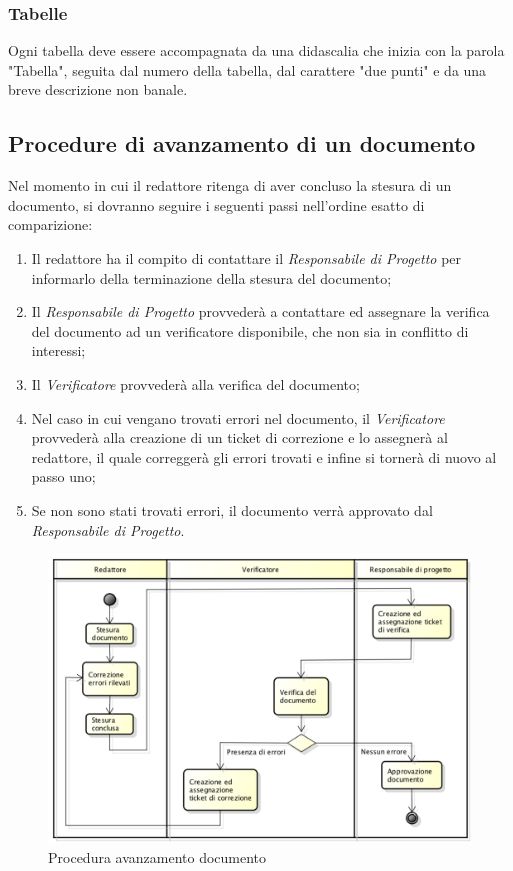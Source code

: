 \subsubsection{Tabelle}
Ogni tabella deve essere accompagnata da una didascalia che inizia con la parola "Tabella", seguita dal numero della tabella, dal carattere "due punti" e da una breve descrizione non banale.

\subsection{Procedure di avanzamento di un documento}
Nel momento in cui il redattore ritenga di aver concluso la stesura di un documento, si dovranno seguire i seguenti passi nell'ordine esatto di comparizione:
\begin{enumerate}
	\item Il redattore ha il compito di contattare il \textit{Responsabile di Progetto} per informarlo della terminazione della stesura del documento;
	\item Il \textit{Responsabile di Progetto} provvederà a contattare ed assegnare la verifica del documento ad un verificatore disponibile, che non sia in conflitto di interessi;
	\item Il \textit{Verificatore} provvederà alla  verifica del documento;
	\item Nel caso in cui vengano trovati errori nel documento, il \textit{Verificatore} provvederà alla creazione di un ticket di correzione e lo assegnerà al redattore, il quale correggerà gli errori trovati e infine si tornerà di nuovo al passo uno;
	\item Se non sono stati trovati errori, il documento verrà approvato dal \textit{Responsabile di Progetto}. 
\end{enumerate}
\begin{figure}[h]
\centering
\includegraphics[width=0.9\linewidth]{img/proceduraDocumenti}
\caption[Procedura avanzamento documento]{Procedura avanzamento documento}
\label{fig:proceduraDocumenti}
\end{figure}




